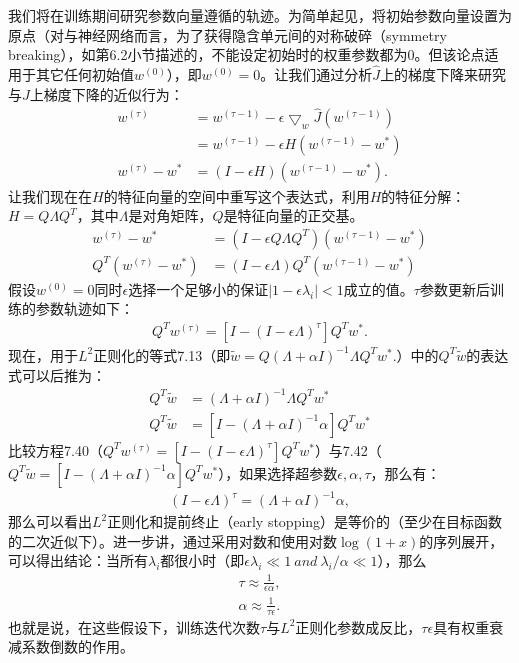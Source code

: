我们将在训练期间研究参数向量遵循的轨迹。为简单起见，将初始参数向量设置为原点（对与神经网络而言，为了获得隐含单元间的对称破碎（symmetry breaking），如第6.2小节描述的，不能设定初始时的权重参数都为$0$。但该论点适用于其它任何初始值$w^{(0)}$），即$w^{(0)}=0$。让我们通过分析$\hat{J}$上的梯度下降来研究与$J$上梯度下降的近似行为：
$$
\begin{aligned}
w^{(\tau)} & = w^{(\tau - 1)} - \epsilon \bigtriangledown_w \hat{J} (w^{(\tau - 1)}) \\
& = w^{(\tau - 1)} - \epsilon H (w^{(\tau - 1)} - w^*) \\
w^{(\tau)} - w^* & = (I - \epsilon H)(w^{(\tau - 1)} - w^*).
\end{aligned}
$$
让我们现在在$H$的特征向量的空间中重写这个表达式，利用$H$的特征分解：$H = Q \Lambda Q^T$，其中$\Lambda$是对角矩阵，$Q$是特征向量的正交基。
$$
\begin{aligned}
w^{(\tau)} - w^* & = (I - \epsilon Q \Lambda Q^T) (w^{(\tau - 1)} - w^*) \\
Q^T (w^{(\tau)} - w^*) & = (I - \epsilon \Lambda ) Q^T (w^{(\tau - 1)} - w^*)
\end{aligned}
$$
假设$w^{(0)} = 0$同时$\epsilon$选择一个足够小的保证$|1 - \epsilon \lambda_i| < 1$成立的值。$\tau$参数更新后训练的参数轨迹如下：
$$
\begin{aligned}
	Q^T w^{(\tau)} = [I - (I - \epsilon \Lambda)^{\tau}] Q^T w^*.
\end{aligned}
$$
现在，用于$L^2$正则化的等式7.13（即$\widetilde{w} = Q(\Lambda + \alpha I)^{-1} \Lambda Q^T w^*.$）中的$Q^T\widetilde{w}$的表达式可以后推为：
$$
\begin{aligned}
Q^T \widetilde{w} & = (\Lambda + \alpha I)^{-1} \Lambda Q^T w^* \\
Q^T \widetilde{w} & = [I - (\Lambda + \alpha I)^{-1} \alpha] Q^T w^*
\end{aligned}
$$
比较方程7.40（$Q^T w^{(\tau)} = [I - (I - \epsilon \Lambda)^{\tau}] Q^T w^*$）与7.42（$Q^T \widetilde{w} = [I - (\Lambda + \alpha I)^{-1} \alpha] Q^T w^*$），如果选择超参数$\epsilon, \alpha, \tau$，那么有：
$$
\begin{aligned}
	(I - \epsilon \Lambda)^{\tau} = (\Lambda + \alpha I)^{-1} \alpha,
\end{aligned}
$$
那么可以看出$L^2$正则化和提前终止（early stopping）是等价的（至少在目标函数的二次近似下）。进一步讲，通过采用对数和使用对数$\log{(1+x)}$的序列展开，可以得出结论：当所有$\lambda_i$都很小时（即$\epsilon \lambda_i \ll 1\ and\ \lambda_i/\alpha \ll 1$），那么
$$
\begin{aligned}
\tau \approx \frac{1}{\epsilon \alpha}, \\
\alpha \approx \frac{1}{\tau \epsilon}.
\end{aligned}
$$
也就是说，在这些假设下，训练迭代次数$\tau$与$L^2$正则化参数成反比，$\tau \epsilon$具有权重衰减系数倒数的作用。

